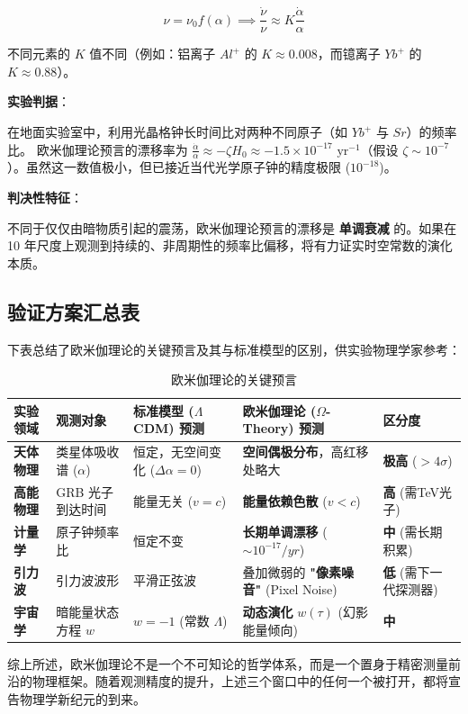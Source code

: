 \[\nu = \nu_0 f(\alpha) \implies \frac{\dot{\nu}}{\nu} \approx K \frac{\dot{\alpha}}{\alpha}\]

不同元素的 $K$ 值不同（例如：铝离子 $Al^+$ 的 $K \approx 0.008$，而镱离子 $Yb^+$ 的 $K \approx 0.88$）。

\textbf{实验判据}：

在地面实验室中，利用光晶格钟长时间比对两种不同原子（如 $Yb^+$ 与 $Sr$）的频率比。
欧米伽理论预言的漂移率为 $\frac{\dot{\alpha}}{\alpha} \approx -\zeta H_0 \approx -1.5 \times 10^{-17} \text{ yr}^{-1}$（假设 $\zeta \sim 10^{-7}$）。虽然这一数值极小，但已接近当代光学原子钟的精度极限 ($10^{-18}$)。

\textbf{判决性特征}：

不同于仅仅由暗物质引起的震荡，欧米伽理论预言的漂移是 \textbf{单调衰减} 的。如果在 10 年尺度上观测到持续的、非周期性的频率比偏移，将有力证实时空常数的演化本质。

\subsection{验证方案汇总表}

下表总结了欧米伽理论的关键预言及其与标准模型的区别，供实验物理学家参考：

\begin{table}[ht]
\centering
\small
\begin{tabularx}{\textwidth}{|p{1.8cm}|p{2.2cm}|p{3.5cm}|p{3.5cm}|p{2cm}|}
\hline
\textbf{实验领域} & \textbf{观测对象} & \textbf{标准模型 ($\Lambda$CDM) 预测} & \textbf{欧米伽理论 ($\Omega$-Theory) 预测} & \textbf{区分度} \\
\hline
\textbf{天体物理} & 类星体吸收谱 ($\alpha$) & 恒定，无空间变化 ($\Delta \alpha = 0$) & \textbf{空间偶极分布}，高红移处略大 & \textbf{极高} ($>4\sigma$) \\
\hline
\textbf{高能物理} & GRB 光子到达时间 & 能量无关 ($v=c$) & \textbf{能量依赖色散} ($v < c$) & \textbf{高} (需TeV光子) \\
\hline
\textbf{计量学} & 原子钟频率比 & 恒定不变 & \textbf{长期单调漂移} ($\sim 10^{-17}/yr$) & \textbf{中} (需长期积累) \\
\hline
\textbf{引力波} & 引力波波形 & 平滑正弦波 & 叠加微弱的 \textbf{"像素噪音"} (Pixel Noise) & \textbf{低} (需下一代探测器) \\
\hline
\textbf{宇宙学} & 暗能量状态方程 $w$ & $w = -1$ (常数 $\Lambda$) & \textbf{动态演化} $w(\tau)$ (幻影能量倾向) & \textbf{中} \\
\hline
\end{tabularx}
\caption{欧米伽理论的关键预言}
\end{table}

综上所述，欧米伽理论不是一个不可知论的哲学体系，而是一个置身于精密测量前沿的物理框架。随着观测精度的提升，上述三个窗口中的任何一个被打开，都将宣告物理学新纪元的到来。
